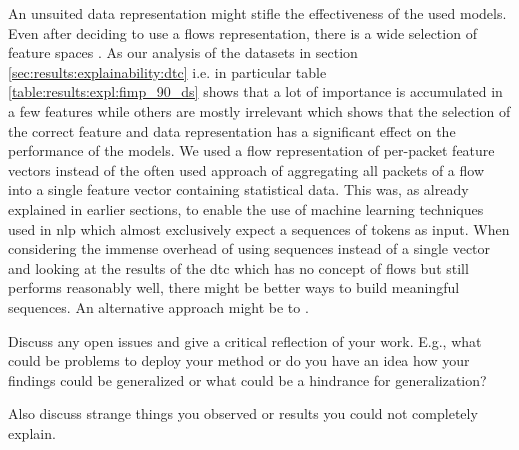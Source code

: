 An unsuited data representation might stifle the effectiveness of the used models. Even after deciding to use a flows representation, there is a wide selection of feature spaces \cite{feature_vectors}.
As our analysis of the datasets in section \ref{sec:results:explainability:dtc} i.e. in particular table \ref{table:results:expl:fimp_90_ds} shows that a lot of importance is accumulated in a few features while others are mostly irrelevant which shows that the selection of the correct feature and data representation has a significant effect on the 
performance of the models. We used a flow representation of per-packet feature vectors instead of the often used approach of aggregating all packets of a flow into a single feature vector containing statistical data. This was, as already explained in earlier sections, to enable the use of machine learning techniques used in \gls{nlp} which almost exclusively expect a sequences of tokens as input. When considering the immense overhead of using sequences instead of a single vector and looking at the results of the \gls{dtc} which has no concept of flows but still performs reasonably well, there might be better ways to build meaningful sequences. An alternative approach might be to    \cite{kitsune}.




Discuss any open issues and give a critical reflection of your work. E.g., what could be problems to deploy your method or do you have an idea how your findings could be generalized or what could be a hindrance for generalization?

Also discuss strange things you observed or results you could not completely explain. 

\newpage